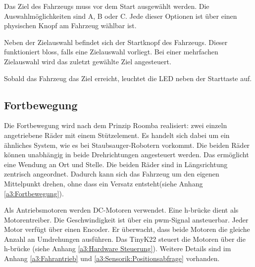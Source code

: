 \documentclass[../main.tex]{subfiles}
\begin{document}
Das Ziel des Fahrzeugs muss vor dem Start ausgewählt werden. Die Auswahlmöglichkeiten sind A, B oder C. Jede dieser Optionen ist über einen physischen Knopf am Fahrzeug wählbar ist.

Neben der Zielauswahl befindet sich der Startknopf des Fahrzeugs. Dieser funktioniert bloss, falls eine Zielauswahl vorliegt. Bei einer mehrfachen Zielauswahl wird das zuletzt gewählte Ziel angesteuert.

Sobald das Fahrzeug das Ziel erreicht, leuchtet die LED neben der Starttaste auf.

\subsection{Fortbewegung} 

Die Fortbewegung wird nach dem Prinzip Roomba realisiert: zwei einzeln angetriebene Räder mit einem Stützelement. Es handelt sich dabei um ein ähnliches System, wie es bei Staubsauger-Robotern vorkommt. Die beiden Räder können unabhängig in beide Drehrichtungen angesteuert werden. Das ermöglicht eine Wendung an Ort und Stelle. Die beiden Räder sind in Längsrichtung zentrisch angeordnet. Dadurch kann sich das Fahrzeug um den eigenen Mittelpunkt drehen, ohne dass ein Versatz entsteht(siehe Anhang \ref{a3:Fortbewegung}).

Als Antriebsmotoren werden DC-Motoren verwendet. Eine \gls{h-brücke} dient als Motorentreiber. Die Geschwindigkeit ist über ein \gls{pwm}-Signal ansteuerbar. Jeder Motor verfügt über einen Encoder. Er überwacht, dass beide Motoren die gleiche Anzahl an Umdrehungen ausführen. Das TinyK22 steuert die Motoren über die \gls{h-brücke} (siehe Anhang \ref{a3:Hardware Steuerung}). Weitere Details sind im Anhang \ref{a3:Fahrantrieb} und \ref{a3:Sensorik:Positionsabfrage} vorhanden.
\end{document}
